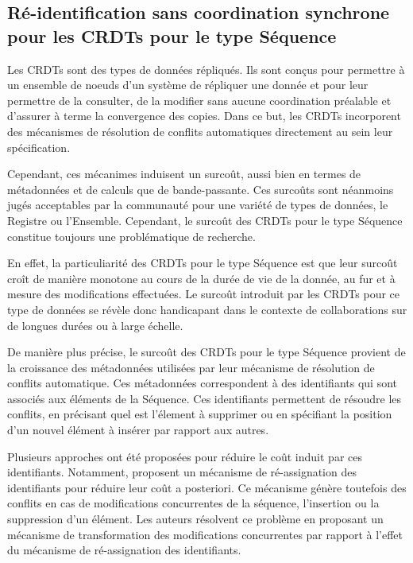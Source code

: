 \subsection{Ré-identification sans coordination synchrone pour les \acp{CRDT} pour le type Séquence}
\label{sec:research-questions-rls}

Les \acfp{CRDT} \cite{2007-crdt-shapiro,shapiro_2011_crdt} sont des types de données répliqués.
Ils sont conçus pour permettre à un ensemble de noeuds d'un système de répliquer une donnée et pour leur permettre de la consulter, de la modifier sans aucune coordination préalable et d'assurer à terme la convergence des copies.
Dans ce but, les \acp{CRDT} incorporent des mécanismes de résolution de conflits automatiques directement au sein leur spécification.

Cependant, ces mécanimes induisent un surcoût, aussi bien en termes de métadonnées et de calculs que de bande-passante.
Ces surcoûts sont néanmoins jugés acceptables par la communauté pour une variété de types de données, \eg le Registre ou l'Ensemble.
Cependant, le surcoût des \acp{CRDT} pour le type Séquence constitue toujours une problématique de recherche.

En effet, la particuliarité des \acp{CRDT} pour le type Séquence est que leur surcoût croît de manière monotone au cours de la durée de vie de la donnée, \ie au fur et à mesure des modifications effectuées.
Le surcoût introduit par les \acp{CRDT} pour ce type de données se révèle donc handicapant dans le contexte de collaborations sur de longues durées ou à large échelle.

De manière plus précise, le surcoût des \acp{CRDT} pour le type Séquence provient de la croissance des métadonnées utilisées par leur mécanisme de résolution de conflits automatique.
Ces métadonnées correspondent à des identifiants qui sont associés aux éléments de la Séquence.
Ces identifiants permettent de résoudre les conflits, \eg en précisant quel est l'élement à supprimer ou en spécifiant la position d'un nouvel élément à insérer par rapport aux autres.

Plusieurs approches ont été proposées pour réduire le coût induit par ces identifiants.
Notamment, \cite{letia:hal-01248270,zawirski:hal-01248197} proposent un mécanisme de ré-assignation des identifiants pour réduire leur coût a posteriori.
Ce mécanisme génère toutefois des conflits en cas de modifications concurrentes de la séquence, \ie l'insertion ou la suppression d'un élément.
Les auteurs résolvent ce problème en proposant un mécanisme de transformation des modifications concurrentes par rapport à l'effet du mécanisme de ré-assignation des identifiants.


